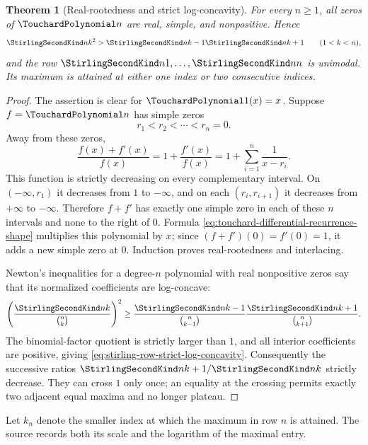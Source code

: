\documentclass[11pt,a4paper,oneside,openany]{book}
\newtheorem{theorem}{Theorem}[chapter]
\theoremstyle{definition}
\theoremstyle{remark}
\begin{document}
\begin{theorem}[Real-rootedness and strict log-concavity]
\label{thm:stirling-row-log-concavity}
For every $n\ge1$, all zeros of $\TouchardPolynomial n$ are real, simple, and nonpositive.  Hence
\begin{equation}
\label{eq:stirling-row-strict-log-concavity}
 \StirlingSecondKind nk^2>\StirlingSecondKind n{k-1}\StirlingSecondKind n{k+1}
 \qquad(1<k<n),
\end{equation}
and the row
$\StirlingSecondKind n1,\ldots,\StirlingSecondKind nn$ is unimodal.  Its maximum is attained at either
one index or two consecutive indices.
\end{theorem}
\begin{proof}
The assertion is clear for $\TouchardPolynomial1(x)=x$.  Suppose $f=\TouchardPolynomial n$ has simple zeros
\[
 r_1<r_2<\cdots<r_n=0.
\]
Away from these zeros,
\[
 \frac{f(x)+f'(x)}{f(x)}=1+\frac{f'(x)}{f(x)}
 =1+\sum_{i=1}^{n}\frac1{x-r_i}.
\]
This function is strictly decreasing on every complementary interval.  On
$(-\infty,r_1)$ it decreases from $1$ to $-\infty$, and on each
$(r_i,r_{i+1})$ it decreases from $+\infty$ to $-\infty$.  Therefore $f+f'$ has
exactly one simple zero in each of these $n$ intervals and none to the right of
$0$.  Formula \eqref{eq:touchard-differential-recurrence-shape} multiplies this
polynomial by $x$; since $(f+f')(0)=f'(0)=1$, it adds a new simple zero at $0$.
Induction proves real-rootedness and interlacing.

Newton's inequalities for a degree-$n$ polynomial with real nonpositive zeros say
that its normalized coefficients are log-concave:
\[
 \left(\frac{\StirlingSecondKind nk}{\binom nk}\right)^2
 \ge
 \frac{\StirlingSecondKind n{k-1}}{\binom n{k-1}}
 \frac{\StirlingSecondKind n{k+1}}{\binom n{k+1}}.
\]
The binomial-factor quotient is strictly larger than $1$, and all interior
coefficients are positive, giving \eqref{eq:stirling-row-strict-log-concavity}.
Consequently the successive ratios
$\StirlingSecondKind n{k+1}/\StirlingSecondKind nk$ strictly decrease.  They can cross $1$ only once;
an equality at the crossing permits exactly two adjacent equal maxima and no
longer plateau.
\end{proof}

Let $k_n$ denote the smaller index at which the maximum in row $n$ is attained.
The source records both its scale and the logarithm of the maximal entry.
\end{document}
